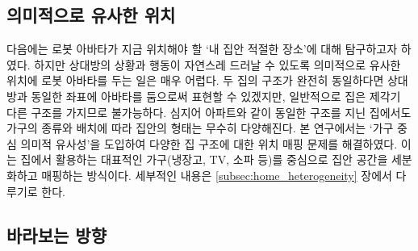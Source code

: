


\subsection{의미적으로 유사한 위치}

다음에는 로봇 아바타가 지금 위치해야 할 `내 집안 적절한 장소'에 대해 탐구하고자 하였다. 하지만 상대방의 상황과 행동이 자연스레 드러날 수 있도록 의미적으로 유사한 위치에 로봇 아바타를 두는 일은 매우 어렵다. 두 집의 구조가 완전히 동일하다면 상대방과 동일한 좌표에 아바타를 둠으로써 표현할 수 있겠지만, 일반적으로 집은 제각기 다른 구조를 가지므로 불가능하다. 심지어 아파트와 같이 동일한 구조를 지닌 집에서도 가구의 종류와 배치에 따라 집안의 형태는 무수히 다양해진다. 본 연구에서는 `가구 중심 의미적 유사성'을 도입하여 다양한 집 구조에 대한 위치 매핑 문제를 해결하였다. 이는 집에서 활용하는 대표적인 가구(냉장고, TV, 소파 등)를 중심으로 집안 공간을 세분화하고 매핑하는 방식이다. 세부적인 내용은 \ref{subsec:home_heterogeneity} 장에서 다루기로 한다.


\subsection{바라보는 방향}


